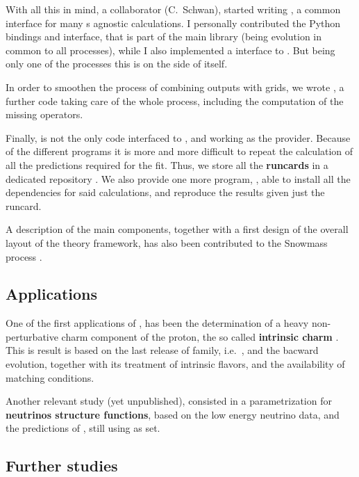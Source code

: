 With all this in mind, a collaborator (C.\ Schwan), started writing
\textbf{\pineappl{}} , a common
interface for many \pdf{}s agnostic calculations.
I personally contributed the Python bindings and \eko{} interface, that is part
of the main library (being evolution in common to all processes), while I also
implemented a \yadism{} interface to \pineappl{}. But being \dis{} only one of
the processes this is on the side of \yadism{} itself.

In order to smoothen the process of combining \eko{} outputs with \pineappl{}
grids, we wrote \textbf{\pineko{}}, a
further code taking care of the whole process, including the computation of the
missing \eko{} operators.

Finally, \yadism{} is not the only code interfaced to \pineappl{}, and working
as the provider.
Because of the different programs it is more and more difficult to repeat the
calculation of all the predictions required for the fit. Thus, we store all the
\textbf{runcards} in a dedicated repository
.
We also provide one more program, \textbf{\pinefarm{}}, able to install all the
dependencies for said calculations, and reproduce the results given just the
runcard.

A description of the main components, together with a first design of the
overall layout of the theory framework, has also been contributed to the
Snowmass process .

\subsection*{Applications}

One of the first applications of \eko{}, has been the determination of a heavy
non-perturbative charm component of the proton, the so called \textbf{intrinsic
charm} .
This is result is based on the last release of \nnpdf{} family, i.e.\
, and the \eko{} bacward evolution, together with its treatment of
intrinsic flavors, and the availability of \nnnlo matching conditions.

Another relevant study (yet unpublished), consisted in a parametrization for
\textbf{neutrinos structure functions}, based on the low energy neutrino \dis{}
data, and the \pqcd{} predictions of \yadism{}, still using \nnpdf{4.0} as
\pdf{} set.

\subsection*{Further studies}

